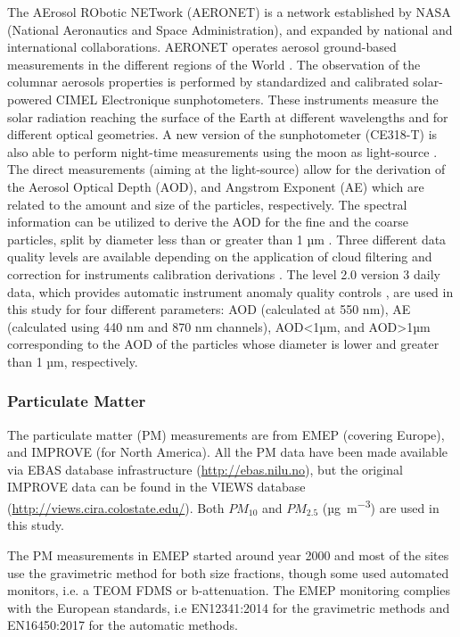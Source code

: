 \documentclass[journal abbreviation, manuscript]{copernicus}
\begin{document}
The AErosol RObotic NETwork (AERONET) is a network established by NASA (National Aeronautics and Space Administration), and expanded by national and international collaborations. AERONET operates aerosol ground-based measurements in the different regions of the World \citep{holben2001emerging}. The observation of the columnar aerosols properties is performed by standardized and calibrated solar-powered CIMEL Electronique sunphotometers. These instruments measure the solar radiation reaching the surface of the Earth at different wavelengths and for different optical geometries. A new version of the sunphotometer (CE318-T) is also able to perform night-time measurements using the moon as light-source \citep{barreto2016new}. The direct measurements (aiming at the light-source) allow for the derivation of the Aerosol Optical Depth (AOD), and Angstrom Exponent (AE) which are related to the amount and size of the particles, respectively. The spectral information can be utilized to derive the AOD for the fine and the coarse particles, split by diameter less than or greater than 1 µm \citep{o2003spectral}. Three different data quality levels are available depending on the application of cloud filtering and correction for instruments calibration derivations \citep{smirnov2000cloud,smirnov2004aeronet}. The level 2.0 version 3 daily data, which provides automatic instrument anomaly quality controls \citep{giles2019advancements}, are used in this study for four different parameters:
AOD (calculated at 550 nm), AE (calculated using 440 nm and 870 nm channels), AOD<1µm, and AOD>1µm corresponding to the AOD of the particles whose diameter is lower and greater than 1 µm, respectively.

\subsubsection{Particulate Matter}
The particulate matter (PM) measurements are from EMEP (covering Europe), and IMPROVE (for North America). All the PM data have been made available via EBAS database infrastructure  (\url{http://ebas.nilu.no}), but the original IMPROVE data can be found in the VIEWS database (\url{http://views.cira.colostate.edu/}). Both $PM_{10}$ and $PM_{2.5}$ (\unit{µg.m^{-3}}) are used in this study.

The PM measurements in EMEP started around year 2000  \citep{torseth2012} and most of the sites use the gravimetric method for both size fractions, though some used automated monitors, i.e. a TEOM FDMS or b-attenuation. The EMEP monitoring complies with the European standards, i.e EN12341:2014 for the gravimetric methods and  EN16450:2017 for the automatic methods. 
\end{document}
